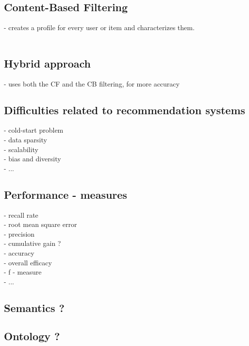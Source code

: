 \documentclass[10pt,oneside,english,a4paper]{article}
\begin{document}
\subsection{Content-Based Filtering}
- creates a profile for every user or item and characterizes them.\\\\


\subsection{Hybrid approach}
- uses both the CF and the CB filtering, for more accuracy




\clearpage
\subsection{Difficulties related to recommendation systems}
- cold-start problem\\
- data sparsity\\
- scalability\\
- bias and diversity\\
- ...\\

\clearpage
\subsection{Performance - measures}
- recall rate\\
- root mean square error\\
- precision\\
- cumulative gain ?\\
- accuracy\\
- overall efficacy\\
- f - measure\\
- ...\\


\clearpage
\subsection{Semantics ?}

\subsection{Ontology ?}
\end{document}
